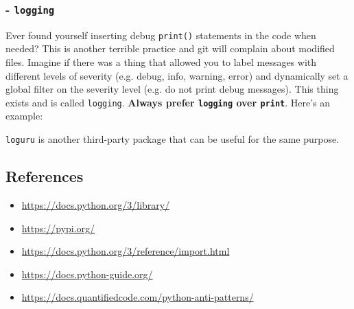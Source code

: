 \subsubsection{- \texttt{logging}}
Ever found yourself inserting debug \texttt{print()} statements in the code when needed? This is another terrible practice and git will complain about modified files. Imagine if there was a thing that allowed you to label messages with different levels of severity (e.g. debug, info, warning, error) and dynamically set a global filter on the severity level (e.g. do not print debug messages). This thing exists and is called \texttt{logging}. \textbf{Always prefer \texttt{logging} over \texttt{print}}. Here's an example:



\texttt{loguru} is another third-party package that can be useful for the same purpose. 

\subsection{References}
\begin{itemize}
    \item[-] \url{https://docs.python.org/3/library/}
    \item[-] \url{https://pypi.org/}
    \item[-] \url{https://docs.python.org/3/reference/import.html}
    \item[-] \url{https://docs.python-guide.org/}
    \item[-] \url{https://docs.quantifiedcode.com/python-anti-patterns/}
\end{itemize}
